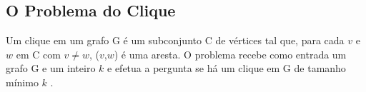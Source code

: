 \subsection{O Problema do Clique}

Um clique em um grafo G é um subconjunto C de vértices tal que, para cada $v$ e $w$ em C com $v \neq w$, ($v$,$w$) é uma aresta.
O problema recebe como entrada um grafo G e um inteiro $k$ e efetua a pergunta se há um clique em G de tamanho mínimo $k$ \cite{goodrichprojeto}.
